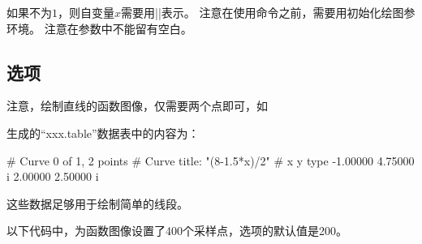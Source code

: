 \documentclass[../main.tex]{subfiles}
\begin{document}
\tkzBomb 如果不为$1$，则自变量$x$需要用|\x|表示。
\tkzHand 注意在使用命令之前，需要用初始化绘图参环境。
\tkzBomb 注意在参数中不能留有空白。
\subsection{选项}

注意，绘制直线的函数图像，仅需要两个点即可，如

\begin{tkzltxexample}[]
\end{tkzltxexample}


生成的\enquote{xxx.table}数据表中的内容为：

\begin{tkzltxexample}[]
# Curve 0 of 1, 2 points
# Curve title: "(8-1.5*x)/2"
# x y type
-1.00000 4.75000  i
2.00000 2.50000  i
\end{tkzltxexample}

这些数据足够用于绘制简单的线段。

以下代码中，为函数图像设置了400个采样点，选项的默认值是200。

\medskip
\begin{tkzexample}[latex=7cm]
\end{tkzexample}
\end{document}
